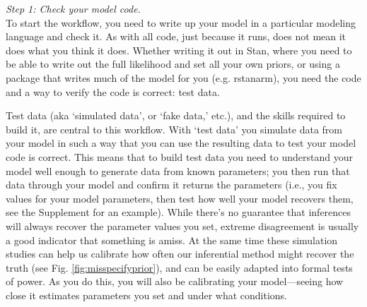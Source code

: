 \documentclass[11pt]{article}
\begin{document}
{\emph{Step 1: Check your model code.} \\ 
To start the workflow, you need to write up your model in a particular modeling language and check it. As with all code, just because it runs, does not mean it does what you think it does. Whether writing it out in \textsf{Stan}, where you need to be able to write out the full likelihood and set all your own priors, or using a package that writes much of the model for you (e.g. \textsf{rstanarm}), you need the code and a way to verify the code is correct: test data.

Test data (aka `simulated data', or  `fake data,' etc.), and the skills required to build it, are central to this workflow. With `test data' you simulate data from your model in such a way that you can use the resulting data to test your model code is correct. This means that to build test data you need to understand your model well enough to generate data from known parameters; you then run that data through your model and confirm it returns the parameters (i.e., you fix values for your model parameters, then test how well your model recovers them, see the Supplement for an example). While there's no guarantee that inferences will always recover the parameter values you set, extreme disagreement is usually a good indicator that something is amiss. At the same time these simulation studies can help us calibrate how often our inferential method might recover the truth (see Fig. \ref{fig:misspecifyprior}), and can be easily adapted into formal tests of power. As you do this, you will also be calibrating your model---seeing how close it estimates parameters you set and under what conditions. %


}
\end{document}
